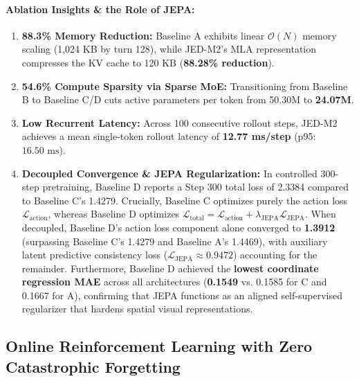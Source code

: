 \documentclass[10pt,twocolumn,letterpaper]{article}
\begin{document}
\paragraph{Ablation Insights \& the Role of JEPA:}
\begin{enumerate}[leftmargin=*]
    \item \textbf{88.3\% Memory Reduction:} Baseline A exhibits linear $\mathcal{O}(N)$ memory scaling (1,024 KB by turn 128), while JED-M2's MLA representation compresses the KV cache to 120 KB (\textbf{88.28\% reduction}).
    \item \textbf{54.6\% Compute Sparsity via Sparse MoE:} Transitioning from Baseline B to Baseline C/D cuts active parameters per token from 50.30M to \textbf{24.07M}.
    \item \textbf{Low Recurrent Latency:} Across 100 consecutive rollout steps, JED-M2 achieves a mean single-token rollout latency of \textbf{12.77 ms/step} (p95: $16.50\text{ ms}$).
    \item \textbf{Decoupled Convergence \& JEPA Regularization:} In controlled 300-step pretraining, Baseline D reports a Step 300 total loss of 2.3384 compared to Baseline C's 1.4279. Crucially, Baseline C optimizes purely the action loss $\mathcal{L}_{\text{action}}$, whereas Baseline D optimizes $\mathcal{L}_{\text{total}} = \mathcal{L}_{\text{action}} + \lambda_{\text{JEPA}}\mathcal{L}_{\text{JEPA}}$. When decoupled, Baseline D's action loss component alone converged to \textbf{1.3912} (surpassing Baseline C's 1.4279 and Baseline A's 1.4469), with auxiliary latent predictive consistency loss ($\mathcal{L}_{\text{JEPA}} \approx 0.9472$) accounting for the remainder. Furthermore, Baseline D achieved the \textbf{lowest coordinate regression MAE} across all architectures (\textbf{0.1549} vs. 0.1585 for C and 0.1667 for A), confirming that JEPA functions as an aligned self-supervised regularizer that hardens spatial visual representations.
\end{enumerate}

\subsection{Online Reinforcement Learning with Zero Catastrophic Forgetting}
\label{sec:grpo}
\end{document}
